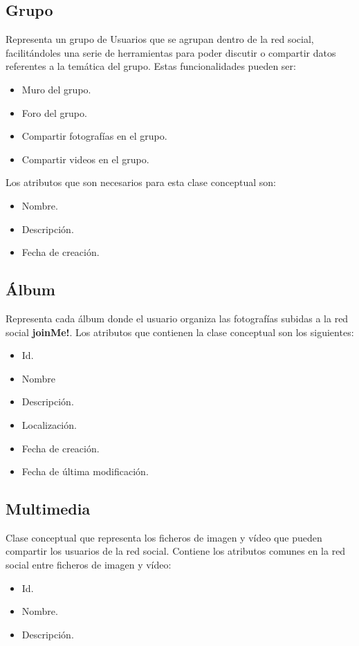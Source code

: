 \documentclass[12pt, a4paper, titlepage]{article}
\begin{document}
\subsection{Grupo}
	Representa un grupo de Usuarios que se agrupan dentro de la red social, facilitándoles una serie de herramientas para poder discutir o compartir datos referentes a la temática del grupo. Estas funcionalidades pueden ser:
	\begin{itemize}
		\item Muro del grupo.
		\item Foro del grupo.
		\item Compartir fotografías en el grupo.
		\item Compartir videos en el grupo.
	\end{itemize}
	Los atributos que son necesarios para esta clase conceptual son:
	\begin{itemize}
		\item Nombre.
		\item Descripción.
		\item Fecha de creación.
	\end{itemize}
\subsection{Álbum}
	Representa cada álbum donde el usuario organiza las fotografías subidas a la red social \textbf{joinMe!}. Los atributos que contienen la clase conceptual son los siguientes:
	\begin{itemize}
		\item Id.
		\item Nombre
		\item Descripción.
		\item Localización.
		\item Fecha de creación.
		\item Fecha de última modificación.
	\end{itemize}
\subsection{Multimedia}
	Clase conceptual que representa los ficheros de imagen y vídeo que pueden compartir los usuarios de la red social. Contiene los atributos comunes en la red social entre ficheros de imagen y vídeo:
	\begin{itemize}
		\item Id.
		\item Nombre.
		\item Descripción.
	\end{itemize}
\end{document}
